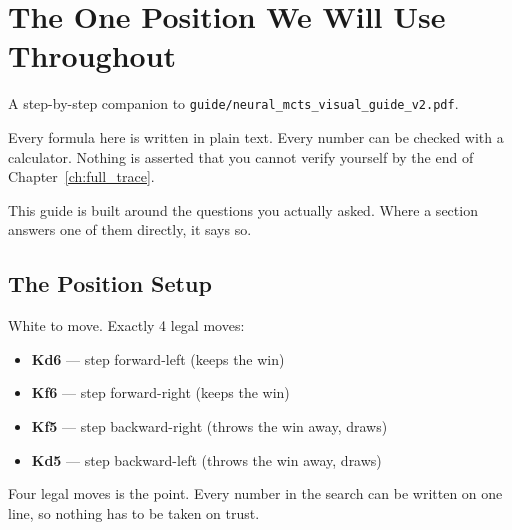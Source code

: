 \chapter{The One Position We Will Use Throughout}
\label{ch:position}

A step-by-step companion to \texttt{guide/neural\_mcts\_visual\_guide\_v2.pdf}.

Every formula here is written in plain text. Every number can be checked with a calculator. Nothing is asserted that you cannot verify yourself by the end of Chapter~\ref{ch:full_trace}.

This guide is built around the questions you actually asked. Where a section answers one of them directly, it says so.

\section{The Position Setup}

\begin{center}

\label{fig:board}
\end{center}

White to move. Exactly 4 legal moves:
\begin{itemize}[leftmargin=2em]
  \item \textbf{Kd6} --- step forward-left (keeps the win)
  \item \textbf{Kf6} --- step forward-right (keeps the win)
  \item \textbf{Kf5} --- step backward-right (throws the win away, draws)
  \item \textbf{Kd5} --- step backward-left (throws the win away, draws)
\end{itemize}

Four legal moves is the point. Every number in the search can be written on one line, so nothing has to be taken on trust.
